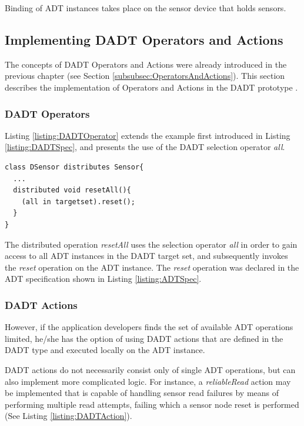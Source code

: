 Binding of ADT instances takes place on the sensor device that holds sensors.

\subsection{Implementing DADT Operators and Actions}
\label{subsubsec:OperatorsAndActionsImpl}

The concepts of DADT Operators and Actions were already introduced in the
previous chapter (see Section \ref{subsubsec:OperatorsAndActions}). This
section describes the implementation of Operators and Actions in the DADT
prototype \cite{migliavacca_DADT:2006}.

\subsubsection{DADT Operators}
Listing \ref{listing:DADTOperator} extends the example first introduced in
Listing \ref{listing:DADTSpec}, and presents the use of the DADT selection
operator \emph{all}.

\begin{lstlisting}[frame=trbl, basewidth={0.55em, 0.6em}, captionpos=b, 
basicstyle=\ttfamily\footnotesize, breaklines, caption = Use of DADT Selection Operator, label = listing:DADTOperator]  
class DSensor distributes Sensor{
  ...
  distributed void resetAll(){
    (all in targetset).reset();
  }
}
\end{lstlisting}

The distributed operation \emph{resetAll} uses the selection operator 
\emph{all} in order to gain access to all ADT instances in the DADT
target set, and subsequently invokes the \emph{reset} operation on the ADT
instance. The \emph{reset} operation was declared in the ADT specification
shown in Listing \ref{listing:ADTSpec}.

\subsubsection{DADT Actions}
However, if the application developers finds the set of available ADT operations limited, he/she has the option of using DADT actions that are defined in the DADT type and executed locally on the ADT instance.

DADT actions do not necessarily consist only of single ADT operations, but can
also implement more complicated logic. For instance, a
\emph{reliableRead} action may be implemented that is capable of handling sensor read failures by means of performing multiple read attempts, failing which
a sensor node reset is performed (See Listing \ref{listing:DADTAction}).
 
